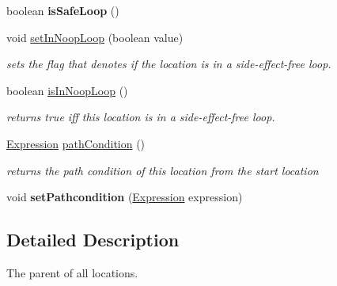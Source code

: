 \begin{DoxyCompactItemize}
\item 
\hypertarget{classedu_1_1udel_1_1cis_1_1vsl_1_1civl_1_1model_1_1common_1_1location_1_1CommonLocation_a1e42bbaab7ff85eabb95f65cecc68123}{}boolean {\bfseries is\+Safe\+Loop} ()\label{classedu_1_1udel_1_1cis_1_1vsl_1_1civl_1_1model_1_1common_1_1location_1_1CommonLocation_a1e42bbaab7ff85eabb95f65cecc68123}

\item 
void \hyperlink{classedu_1_1udel_1_1cis_1_1vsl_1_1civl_1_1model_1_1common_1_1location_1_1CommonLocation_a28cfe3ef169b53e83698a602023f91ed}{set\+In\+Noop\+Loop} (boolean value)
\begin{DoxyCompactList}\small\item\em sets the flag that denotes if the location is in a side-\/effect-\/free loop. \end{DoxyCompactList}\item 
boolean \hyperlink{classedu_1_1udel_1_1cis_1_1vsl_1_1civl_1_1model_1_1common_1_1location_1_1CommonLocation_a00c51776b99625c923c17b301737e24c}{is\+In\+Noop\+Loop} ()
\begin{DoxyCompactList}\small\item\em returns true iff this location is in a side-\/effect-\/free loop. \end{DoxyCompactList}\item 
\hyperlink{interfaceedu_1_1udel_1_1cis_1_1vsl_1_1civl_1_1model_1_1IF_1_1expression_1_1Expression}{Expression} \hyperlink{classedu_1_1udel_1_1cis_1_1vsl_1_1civl_1_1model_1_1common_1_1location_1_1CommonLocation_a551ecc8024926d437529f8964879630e}{path\+Condition} ()
\begin{DoxyCompactList}\small\item\em returns the path condition of this location from the start location \end{DoxyCompactList}\item 
\hypertarget{classedu_1_1udel_1_1cis_1_1vsl_1_1civl_1_1model_1_1common_1_1location_1_1CommonLocation_ae9074156dd07759ae1e6c7268394dcde}{}void {\bfseries set\+Pathcondition} (\hyperlink{interfaceedu_1_1udel_1_1cis_1_1vsl_1_1civl_1_1model_1_1IF_1_1expression_1_1Expression}{Expression} expression)\label{classedu_1_1udel_1_1cis_1_1vsl_1_1civl_1_1model_1_1common_1_1location_1_1CommonLocation_ae9074156dd07759ae1e6c7268394dcde}

\end{DoxyCompactItemize}


\subsection{Detailed Description}
The parent of all locations. 


